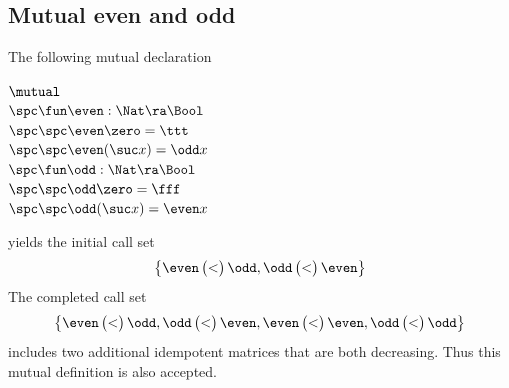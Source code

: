 \subsection{Mutual even and odd}

The following mutual declaration 
\begin{bsp}
$\mutual$\\
$\spc \fun \even : \Nat \ra \Bool$\\
$\spc \spc \even \zero = \ttt $\\
$\spc \spc \even (\suc x) = \odd x $\\
$\spc \fun \odd : \Nat \ra \Bool$\\
$\spc \spc \odd \zero = \fff$\\
$\spc \spc \odd (\suc x) = \even x$
\end{bsp}
yields the initial call set  
\[
\left\{
\even \begin{pmatrix}
< \\
\end{pmatrix}\odd
, 
\odd \begin{pmatrix}
< \\
\end{pmatrix}\even
\right\}
\] 
\noindent The completed call set
\[
\left\{
\even \begin{pmatrix}
< \\
\end{pmatrix}\odd
, 
\odd \begin{pmatrix}
< \\
\end{pmatrix}\even
,
\even \begin{pmatrix}
< \\
\end{pmatrix}\even
, 
\odd \begin{pmatrix}
< \\
\end{pmatrix}\odd
\right\}
\] 
includes two additional idempotent matrices that are both decreasing.
Thus this mutual definition is also accepted.
